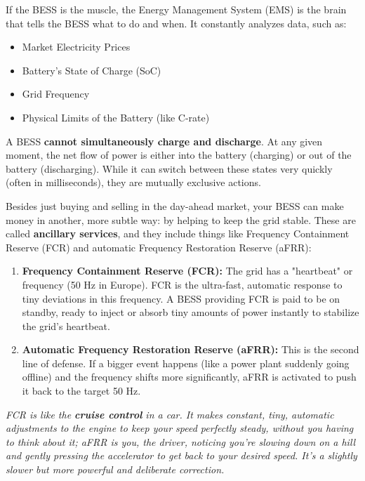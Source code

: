 \begin{itemize}
If the BESS is the muscle, the Energy Management System (EMS) is the brain that tells the BESS what to do and when. It constantly analyzes data, such as:
\begin{itemize}
    \item Market Electricity Prices
    \item Battery's State of Charge (SoC)
    \item Grid Frequency
    \item Physical Limits of the Battery (like C-rate)
\end{itemize}

A BESS \textbf{cannot simultaneously charge and discharge}. At any given moment, the net flow of power is either into the battery (charging) or out of the battery (discharging). While it can switch between these states very quickly (often in milliseconds), they are mutually exclusive actions.

Besides just buying and selling in the day-ahead market, your BESS can make money in another, more subtle way: by helping to keep the grid stable. These are called \textbf{ancillary services}, and they include things like Frequency Containment Reserve (FCR) and automatic Frequency Restoration Reserve (aFRR):

\begin{enumerate}
    \item \textbf{Frequency Containment Reserve (FCR):} The grid has a "heartbeat" or frequency (50 Hz in Europe). FCR is the ultra-fast, automatic response to tiny deviations in this frequency. A BESS providing FCR is paid to be on standby, ready to inject or absorb tiny amounts of power instantly to stabilize the grid's heartbeat.
    \item \textbf{Automatic Frequency Restoration Reserve (aFRR):} This is the second line of defense. If a bigger event happens (like a power plant suddenly going offline) and the frequency shifts more significantly, aFRR is activated to push it back to the target 50 Hz.
\end{enumerate}

\textit{FCR is like the \textbf{cruise control} in a car. It makes constant, tiny, automatic adjustments to the engine to keep your speed perfectly steady, without you having to think about it; aFRR is you, the driver, noticing you're slowing down on a hill and gently pressing the accelerator to get back to your desired speed. It's a slightly slower but more powerful and deliberate correction. }



\end{itemize}
